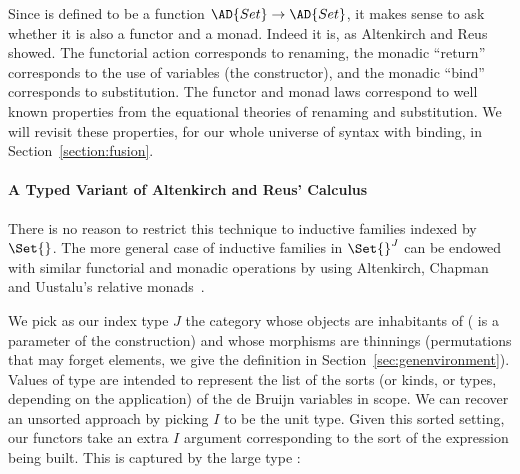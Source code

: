 Since  is defined to be a function $\AD{Set} \to \AD{Set}$, it
makes sense to ask whether it is also a functor and a monad. Indeed it
is, as Altenkirch and Reus showed. The functorial action corresponds
to renaming, the monadic ``return'' corresponds to the use of variables
(the  constructor), and the monadic ``bind'' corresponds
to substitution. The functor and monad laws correspond to well known
properties from the equational theories of renaming and
substitution. We will revisit these properties, for our whole universe
of syntax with binding, in Section~\ref{section:fusion}.

\paragraph*{A Typed Variant of Altenkirch and Reus' Calculus}
\label{section:mech-reus}

There is no reason to restrict this technique to inductive families
indexed by $\Set{}$. The more general case of inductive families in
$\Set{}^J$ can be endowed with similar functorial and monadic
operations by using Altenkirch, Chapman and Uustalu's relative
monads~\citeyear{Altenkirch2010, JFR4389}.

We pick as our index type $J$ the category whose objects are
inhabitants of   ( is a parameter of the
construction) and whose morphisms are thinnings (permutations that may
forget elements, we give the definition in Section~\ref{sec:genenvironment}).  Values of type
  are intended to represent the list of the sorts (or
kinds, or types, depending on the application) of the de Bruijn
variables in scope. We can recover an unsorted approach by picking $I$
to be the unit type.  Given this sorted setting, our functors take an
extra $I$ argument corresponding to the sort of the expression being
built. This is captured by the large type 
:%

